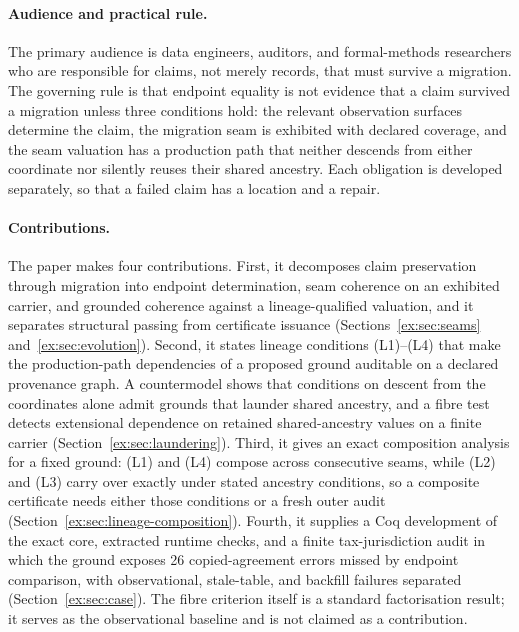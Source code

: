 \documentclass[smallextended,envcountsect,envcountsame,natbib]{svjour3}
\begin{document}
\paragraph{Audience and practical rule.} The primary audience is data engineers, auditors, and formal-methods researchers who are responsible for claims, not merely records, that must survive a migration. The governing rule is that endpoint equality is not evidence that a claim survived a migration unless three conditions hold: the relevant observation surfaces determine the claim, the migration seam is exhibited with declared coverage, and the seam valuation has a production path that neither descends from either coordinate nor silently reuses their shared ancestry. Each obligation is developed separately, so that a failed claim has a location and a repair.

\paragraph{Contributions.} The paper makes four contributions. First, it decomposes claim preservation through migration into endpoint determination, seam coherence on an exhibited carrier, and grounded coherence against a lineage-qualified valuation, and it separates structural passing from certificate issuance (Sections~\ref{ex:sec:seams} and~\ref{ex:sec:evolution}). Second, it states lineage conditions (L1)--(L4) that make the production-path dependencies of a proposed ground auditable on a declared provenance graph. A countermodel shows that conditions on descent from the coordinates alone admit grounds that launder shared ancestry, and a fibre test detects extensional dependence on retained shared-ancestry values on a finite carrier (Section~\ref{ex:sec:laundering}). Third, it gives an exact composition analysis for a fixed ground: (L1) and (L4) compose across consecutive seams, while (L2) and (L3) carry over exactly under stated ancestry conditions, so a composite certificate needs either those conditions or a fresh outer audit (Section~\ref{ex:sec:lineage-composition}). Fourth, it supplies a Coq development of the exact core, extracted runtime checks, and a finite tax-jurisdiction audit in which the ground exposes 26 copied-agreement errors missed by endpoint comparison, with observational, stale-table, and backfill failures separated (Section~\ref{ex:sec:case}). The fibre criterion itself is a standard factorisation result; it serves as the observational baseline and is not claimed as a contribution.
\end{document}
